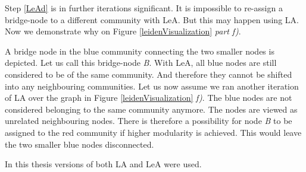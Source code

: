 Step \ref{LeAd} is in further iterations significant.  It is impossible to re-assign a bridge-node to a different community with LeA. But this may happen using LA. Now we demonstrate why on Figure \ref{leidenVisualization} \textit{part f)}. 

A bridge node in the blue community connecting the two smaller nodes is depicted. Let us call this bridge-node \textit{B}. With LeA, all blue nodes are still considered to be of the same community. And therefore they cannot be shifted into any neighbouring communities. Let us now assume we ran another iteration of LA over the graph in Figure \ref{leidenVisualization} \textit{f)}. The blue nodes are not considered belonging to the same community anymore. The nodes are viewed as unrelated neighbouring nodes. There is therefore a possibility for node \textit{B} to be assigned to the red community if higher modularity is achieved. This would leave the two smaller blue nodes disconnected. 

In this thesis versions of both LA and LeA were used.